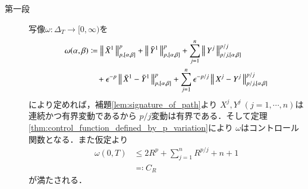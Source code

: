 	\begin{prf}\mbox{}
		\begin{description}
			\item[第一段]
				写像$\omega:\Delta_T \longrightarrow [0,\infty)$を
				\begin{align}
					\omega(\alpha,\beta) &\coloneqq 
					\left\|\, \bar{X}^1\, \right\|_{p,[\alpha,\beta]}^p + \left\|\, \bar{Y}^1\, \right\|_{p,[\alpha,\beta]}^p
					+ \sum_{j=1}^n \left\|\, Y^j\, \right\|_{p/j,[\alpha,\beta]}^{p/j} \\
					&\quad + \epsilon^{-p} \left\|\, \bar{X}^1 - \bar{Y}^1\, \right\|_{p,[\alpha,\beta]}^{p} 
					+ \sum_{j=1}^{n} \epsilon^{-p/j} \left\|\, X^j - Y^j\, \right\|_{p/j,[\alpha,\beta]}^{p/j}
				\end{align}
				により定めれば，補題\ref{lem:signature_of_path}より
				$X^j,Y^j\ (j=1,\cdots,n)$は連続かつ有界変動であるから
				$p/j$変動は有界である．そして定理\ref{thm:control_function_defined_by_p_variation}により
				$\omega$はコントロール関数となる．また仮定より
				\begin{align}
					\omega(0,T) &\leq 2R^p + \sum_{j=1}^n R^{p/j} + n + 1 \\
					&\eqqcolon C_R
				\end{align}
				が満たされる．
				

\end{description}
\end{prf}
